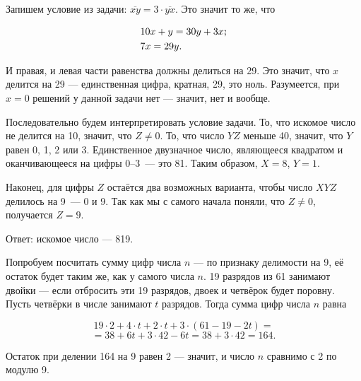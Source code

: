 \begin{itemize}

\itA Запишем условие из задачи: $\overline{xy} = 3 \cdot \overline{yx}$. Это значит то же, что

\vspace{-0.4cm}
\begin{align*}
& 10x + y = 30y + 3x\scolon \\
& 7x = 29y.
\end{align*}

И правая, и левая части равенства должны делиться на 29. Это значит, что $x$ делится на 29 — единственная цифра, кратная, 29, это ноль. Разумеется, при $x=0$ решений у данной задачи нет — значит, нет и вообще.


\itB Последовательно будем интерпретировать условие задачи. То, что искомое число не делится на 10, значит, что $Z \ne 0$. То, что число $YZ$ меньше 40, значит, что $Y$ равен 0, 1, 2 или 3. Единственное двузначное число, являющееся квадратом и оканчивающееся на цифры 0–3~— это 81. Таким образом, $X=8$, $Y=1$.

Наконец, для цифры $Z$ остаётся два возможных варианта, чтобы число $XYZ$ делилось на 9~— 0 и 9. Так как мы с самого начала поняли, что $Z \ne 0$, получается $Z = 9$.

Ответ: искомое число — 819.

\itC Попробуем посчитать сумму цифр числа $n$ — по признаку делимости на 9, её остаток будет таким же, как у самого числа $n$. 19 разрядов из 61 занимают двойки — если отбросить эти 19 разрядов, двоек и четвёрок будет поровну. Пусть четвёрки в числе занимают $t$ разрядов. Тогда сумма цифр числа $n$ равна

\vspace{-0.4cm}
$$19 \cdot 2 + 4 \cdot t + 2 \cdot t + 3 \cdot (61 - 19 - 2t) =$$
$$= 38 + 6t + 3 \cdot 42 - 6t = 38 + 3 \cdot 42 = 164.$$

Остаток при делении 164 на 9 равен 2 — значит, и число $n$ сравнимо с 2 по модулю 9.

\end{itemize}